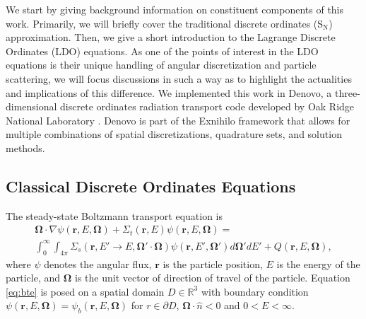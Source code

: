\documentclass{article} %
\newcommand{\bo}{\mathbf\Omega}
\newcommand{\vecr}{\textbf{r}}
\newcommand{\sn}{S$_\mathrm{N}$}
\begin{document}
We start by giving background information on constituent components of this
work. Primarily, we will briefly cover the traditional discrete ordinates
(\sn) approximation. Then, we give a short introduction to the Lagrange
Discrete Ordinates (LDO) equations. As one of the points of interest in the
LDO equations is their unique handling of angular discretization and particle
scattering, we will focus discussions in such a way as to highlight the
actualities and implications of this difference. We implemented this work in
Denovo, a three-dimensional discrete ordinates radiation transport code
developed by Oak Ridge National Laboratory \cite{denovo}. Denovo is part of
the Exnihilo framework that allows for multiple combinations of spatial
discretizations, quadrature sets, and solution methods.

\subsection{Classical Discrete Ordinates Equations}

The steady-state Boltzmann transport equation is
%
\begin{multline}
\bo \cdot \nabla \psi(\vecr,E,\bo) + \Sigma_t(\vecr,E) \psi(\vecr,E,\bo) = \\
\int_0^\infty\int_{4\pi} \Sigma_s(\vecr,E'\rightarrow E,\bo'\cdot\bo)
\psi(\vecr,E',\bo')d\bo'dE' + Q(\vecr,E,\bo),
\label{eq:bte}
\end{multline}
%
where $\psi$ denotes the angular flux, $\vecr$ is the particle
position, $E$ is the energy of the particle, and $\bo$ is the unit vector of
direction of travel of the particle. Equation \eqref{eq:bte} is posed on a
spatial domain $D\in\mathbb{R}^3$ with boundary condition
$\psi\left(\vecr,E,\bo\right)=\psi_b\left(\vecr,E,\bo\right)$ for
$r\in\partial D$, $\bo\cdot\hat{n}<0$ and $0<E<\infty$.
\end{document}
